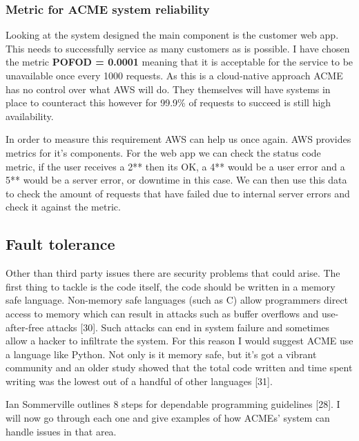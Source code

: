   \subsubsection{Metric for ACME system reliability}

  Looking at the system designed the main component is the customer web app. This needs to successfully service as many customers as is possible.
  I have chosen the metric \textbf{POFOD = 0.0001} meaning that it is acceptable for the service to be unavailable once every 1000 requests. As this is a 
  cloud-native approach ACME has no control over what AWS will do. They themselves will have systems in place to counteract this however for 99.9\% of
  requests to succeed is still high availability.

  In order to measure this requirement AWS can help us once again. AWS provides metrics for it's components. For the web app we can check the status code
  metric, if the user receives a 2** then its OK, a 4** would be a user error and a 5** would be a server error, or downtime in this case. We can 
  then use this data to check the amount of requests that have failed due to internal server errors and check it against the metric.

  \subsection{Fault tolerance}
  Other than third party issues there are security problems that could arise. The first thing to tackle is the code itself, the code should be written in 
  a memory safe language. Non-memory safe languages (such as C) allow programmers direct access to memory which can result in attacks such as buffer
  overflows and use-after-free attacks [30]. Such attacks can end in system failure and sometimes allow a hacker to infiltrate the system. For this 
  reason I would suggest ACME use a language like Python. Not only is it memory safe, but it's got a vibrant community and an older study showed
  that the total code written and time spent writing was the lowest out of a handful of other languages [31].

  Ian Sommerville outlines 8 steps for dependable programming guidelines [28]. I will now go through each one and give examples of how ACMEs' system can 
  handle issues in that area.

